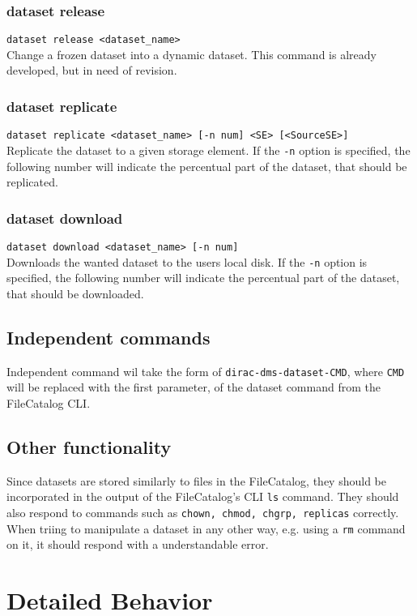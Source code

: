 \documentclass{scrreprt}
\begin{document}
\subsection{dataset release}
\texttt{dataset release <dataset_name>} \\
Change a frozen dataset into a dynamic dataset. This command is already developed, but in need of revision.  

\subsection{dataset replicate}
\texttt{dataset replicate <dataset_name> [-n num] <SE> [<SourceSE>]} \\
Replicate the dataset to a given storage element. If the \texttt{-n} option is specified, the following number will indicate the percentual part of the dataset, that should be replicated.

\subsection{dataset download}
\texttt{dataset download <dataset_name> [-n num]} \\
Downloads the wanted dataset to the users local disk. If the \texttt{-n} option is specified, the following number will indicate the percentual part of the dataset, that should be downloaded.


\section{Independent commands}
Independent command wil take the form of \texttt{dirac-dms-dataset-CMD}, where \texttt{CMD} will be replaced with the first parameter, of the dataset command from the FileCatalog CLI. 


\section{Other functionality} \label{sec:OtherFunc}
Since datasets are stored similarly to files in the FileCatalog, they should be incorporated in the output of the FileCatalog's CLI \texttt{ls} command. They should also respond to commands such as \texttt{chown, chmod, chgrp, replicas} correctly. When triing to manipulate a dataset in any other way, e.g. using a \texttt{rm} command on it, it should respond with a understandable error.



\chapter{Detailed Behavior} \label{chap:Details}
\end{document}
